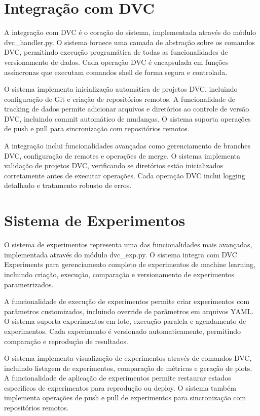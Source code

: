 \documentclass[12pt,a4paper]{article}
\begin{document}
\section{Integração com DVC}

A integração com DVC é o coração do sistema, implementada através do módulo dvc_handler.py. O sistema fornece uma camada de abstração sobre os comandos DVC, permitindo execução programática de todas as funcionalidades de versionamento de dados. Cada operação DVC é encapsulada em funções assíncronas que executam comandos shell de forma segura e controlada.

O sistema implementa inicialização automática de projetos DVC, incluindo configuração de Git e criação de repositórios remotos. A funcionalidade de tracking de dados permite adicionar arquivos e diretórios ao controle de versão DVC, incluindo commit automático de mudanças. O sistema suporta operações de push e pull para sincronização com repositórios remotos.

A integração inclui funcionalidades avançadas como gerenciamento de branches DVC, configuração de remotes e operações de merge. O sistema implementa validação de projetos DVC, verificando se diretórios estão inicializados corretamente antes de executar operações. Cada operação DVC inclui logging detalhado e tratamento robusto de erros.

\section{Sistema de Experimentos}

O sistema de experimentos representa uma das funcionalidades mais avançadas, implementada através do módulo dvc_exp.py. O sistema integra com DVC Experiments para gerenciamento completo de experimentos de machine learning, incluindo criação, execução, comparação e versionamento de experimentos parametrizados.

A funcionalidade de execução de experimentos permite criar experimentos com parâmetros customizados, incluindo override de parâmetros em arquivos YAML. O sistema suporta experimentos em lote, execução paralela e agendamento de experimentos. Cada experimento é versionado automaticamente, permitindo comparação e reprodução de resultados.

O sistema implementa visualização de experimentos através de comandos DVC, incluindo listagem de experimentos, comparação de métricas e geração de plots. A funcionalidade de aplicação de experimentos permite restaurar estados específicos de experimentos para reprodução ou deploy. O sistema também implementa operações de push e pull de experimentos para sincronização com repositórios remotos.
\end{document}
